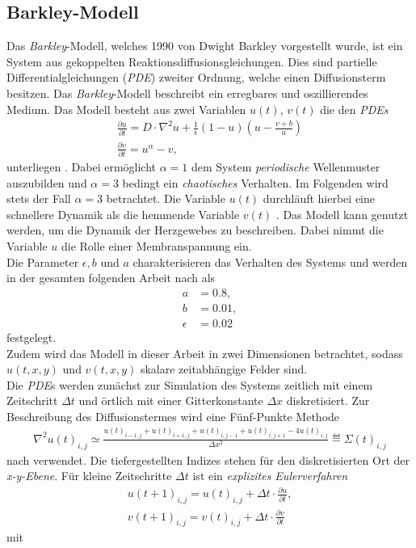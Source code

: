 \subsection{Barkley-Modell}
Das \textit{Barkley}-Modell, welches 1990 von Dwight Barkley vorgestellt wurde, ist ein System aus gekoppelten Reaktionsdiffusionsgleichungen. Dies sind partielle Differentialgleichungen (\textit{PDE}) zweiter Ordnung, welche einen Diffusionsterm besitzen. Das \textit{Barkley}-Modell beschreibt ein erregbares und oszillierendes Medium. Das Modell besteht aus zwei Variablen $u(t)$, $v(t)$ die den  \textit{PDEs}
\begin{equation}
\begin{gathered}
\frac{\partial u}{\partial t} = D \cdot \nabla^2 u + \frac{1}{\epsilon} (1-u) \left(u-\frac{v+b}{a}\right)\\
\frac{\partial v}{\partial t} = u^\alpha-v,
\end{gathered}
\end{equation}
unterliegen \citep{Barkley:2008}. Dabei ermöglicht $\alpha=1$ dem System \textit{periodische} Wellenmuster auszubilden und $\alpha=3$ bedingt ein \textit{chaotisches} Verhalten. Im Folgenden wird stets der Fall $\alpha=3$ betrachtet. Die Variable $u(t)$ durchläuft hierbei eine schnellere Dynamik als die hemmende Variable $v(t)$ \citep{Barkley:2008, berg2011synchronization}. Das Modell kann genutzt werden, um die Dynamik der Herzgewebes zu beschreiben. Dabei nimmt die Variable $u$ die Rolle einer Membranspannung ein.\\
Die Parameter $\epsilon, b$ und $a$ charakterisieren das Verhalten des Systems und werden in der gesamten folgenden Arbeit nach \citep{Barkley:2008} als
\begin{align*}
a &= 0.8,\\ b &= 0.01,\\ \epsilon &= 0.02
\end{align*}
festgelegt.\\
Zudem wird das Modell in dieser Arbeit in zwei Dimensionen betrachtet, sodass $u(t, x,y)$ und $v(t, x,y)$ skalare zeitabhängige Felder sind.\\
Die \textit{PDE}s werden zunächst zur Simulation des Systems zeitlich mit einem Zeitschritt $\Delta t$ und örtlich mit einer Gitterkonstante $\Delta x$ diskretisiert. Zur Beschreibung des Diffusionstermes wird eine Fünf-Punkte Methode
\begin{align}
\nabla^2 u(t)_{i,j} \simeq \frac{u(t)_{i-1, j} + u(t)_{i+1,j} + u(t)_{i,j-1} + u(t)_{i,j+1} - 4 u(t)_{i,j}}{\Delta x^2} \eqdef \Sigma(t)_{i,j}
\end{align} 
nach \citep{Barkley:2008} verwendet. Die tiefergestellten Indizes stehen für den diskretisierten Ort der \textit{x-y-Ebene}.
Für kleine Zeitschritte $\Delta t$ ist ein \textit{explizites Eulerverfahren}
\begin{equation}
\begin{gathered}
u(t+1)_{i,j} = u(t)_{i,j} + \Delta t \cdot \frac{\partial u}{\partial t},\\
v(t+1)_{i,j} = v(t)_{i,j} + \Delta t \cdot \frac{\partial v}{\partial t}
\end{gathered}
\end{equation}
mit

